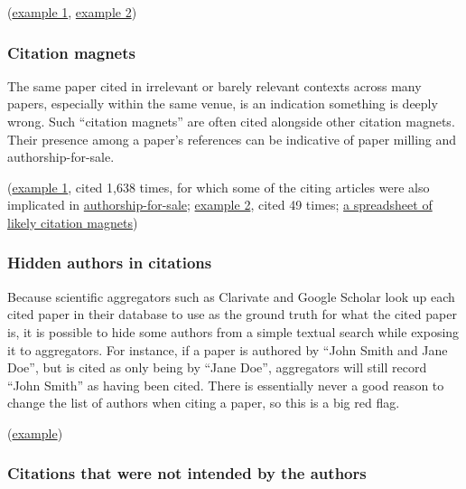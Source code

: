 \documentclass[letterpaper, 12pt]{article}
\begin{document}
(\href{https://pubpeer.com/publications/90719DBC6E5FF2AC32FDE74F1A6A7F}{example 1}, \href{https://pubpeer.com/publications/1924F147DE045B97261004EB2387AE}{example 2})

\subsubsection*{Citation magnets}

The same paper cited in irrelevant or barely relevant contexts across many papers,
especially within the same venue, is an indication something is deeply wrong.  Such ``citation magnets'' are often cited alongside other citation magnets. Their presence among a paper's references can be indicative of paper milling and authorship-for-sale.

(\href{https://pubpeer.com/search?q=%22A+novel+Aluminum%E2%80%93graphite+dual-Ion+battery%22}{example 1}, cited 1,638 times, for which some of the citing articles were also implicated in \href{https://pubpeer.com/publications/DF9A5CE25CF36DDAFF4B6695B91EA7}{authorship-for-sale}; \href{https://pubpeer.com/publications/B71DD139D3549DCCA37DCEC8AF59D5}{example 2}, cited 49 times;  \href{https://docs.google.com/spreadsheets/d/1o-9OIyzZ9mMqA7bprcbI5nemtYBfxiXH1ndI3y5A43E/edit?usp=sharing}{a spreadsheet of likely citation magnets})

\subsubsection*{Hidden authors in citations}

Because scientific aggregators such as Clarivate and Google Scholar look up each cited paper in their database to use as the ground truth for what the cited paper is, it is possible to hide some authors from a simple textual search while exposing it to aggregators. For instance, if a paper is authored by ``John Smith and Jane Doe'', but is cited as only being by ``Jane Doe'', aggregators will still record ``John Smith'' as having been cited. There is essentially never a good reason to change the list of authors when citing a paper, so this is a big red flag.

(\href{https://pubpeer.com/publications/70181CC72B128D680AEC3E940F3495}{example})

\subsubsection*{Citations that were not intended by the authors}
\end{document}
